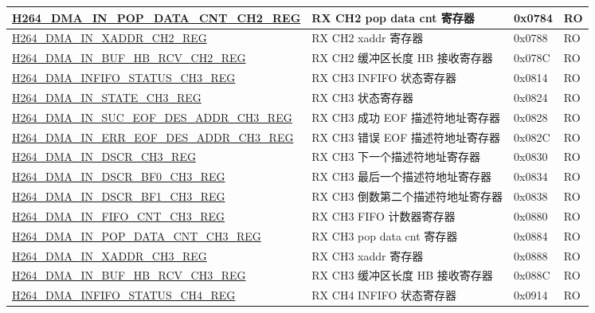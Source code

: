 \begin{longtable}{ | p{7.5cm} | p{5.7cm} | p{1.2cm} | p{1.5cm} | }
    \hyperref[regdesc:H264DMAINPOPDATACNTCH2REG]{H264\_DMA\_IN\_POP\_DATA\_CNT\_CH2\_REG} & RX CH2 pop data cnt 寄存器 & 0x0784 & RO \\ \hline
    \hyperref[regdesc:H264DMAINXADDRCH2REG]{H264\_DMA\_IN\_XADDR\_CH2\_REG} & RX CH2 xaddr 寄存器 & 0x0788 & RO \\ \hline
    \hyperref[regdesc:H264DMAINBUFHBRCVCH2REG]{H264\_DMA\_IN\_BUF\_HB\_RCV\_CH2\_REG} & RX CH2  缓冲区长度 HB 接收寄存器 & 0x078C & RO \\ \hline
    \hyperref[regdesc:H264DMAINFIFOSTATUSCH3REG]{H264\_DMA\_INFIFO\_STATUS\_CH3\_REG} & RX CH3 INFIFO 状态寄存器 & 0x0814 & RO \\ \hline
    \hyperref[regdesc:H264DMAINSTATECH3REG]{H264\_DMA\_IN\_STATE\_CH3\_REG} & RX CH3 状态寄存器 & 0x0824 & RO \\ \hline
    \hyperref[regdesc:H264DMAINSUCEOFDESADDRCH3REG]{H264\_DMA\_IN\_SUC\_EOF\_DES\_ADDR\_CH3\_REG} & RX CH3 成功 EOF 描述符地址寄存器 & 0x0828 & RO \\ \hline
    \hyperref[regdesc:H264DMAINERREOFDESADDRCH3REG]{H264\_DMA\_IN\_ERR\_EOF\_DES\_ADDR\_CH3\_REG} & RX CH3 错误 EOF 描述符地址寄存器 & 0x082C & RO \\ \hline
    \hyperref[regdesc:H264DMAINDSCRCH3REG]{H264\_DMA\_IN\_DSCR\_CH3\_REG} & RX CH3 下一个描述符地址寄存器 & 0x0830 & RO \\ \hline
    \hyperref[regdesc:H264DMAINDSCRBF0CH3REG]{H264\_DMA\_IN\_DSCR\_BF0\_CH3\_REG} & RX CH3 最后一个描述符地址寄存器 & 0x0834 & RO \\ \hline
    \hyperref[regdesc:H264DMAINDSCRBF1CH3REG]{H264\_DMA\_IN\_DSCR\_BF1\_CH3\_REG} & RX CH3 倒数第二个描述符地址寄存器 & 0x0838 & RO \\ \hline
    \hyperref[regdesc:H264DMAINFIFOCNTCH3REG]{H264\_DMA\_IN\_FIFO\_CNT\_CH3\_REG} & RX CH3 FIFO 计数器寄存器 & 0x0880 & RO \\ \hline
    \hyperref[regdesc:H264DMAINPOPDATACNTCH3REG]{H264\_DMA\_IN\_POP\_DATA\_CNT\_CH3\_REG} & RX CH3 pop data cnt 寄存器 & 0x0884 & RO \\ \hline
    \hyperref[regdesc:H264DMAINXADDRCH3REG]{H264\_DMA\_IN\_XADDR\_CH3\_REG} & RX CH3 xaddr 寄存器 & 0x0888 & RO \\ \hline
    \hyperref[regdesc:H264DMAINBUFHBRCVCH3REG]{H264\_DMA\_IN\_BUF\_HB\_RCV\_CH3\_REG} & RX CH3  缓冲区长度 HB 接收寄存器 & 0x088C & RO \\ \hline
    \hyperref[regdesc:H264DMAINFIFOSTATUSCH4REG]{H264\_DMA\_INFIFO\_STATUS\_CH4\_REG} & RX CH4 INFIFO 状态寄存器 & 0x0914 & RO \\ \hline

\end{longtable}
